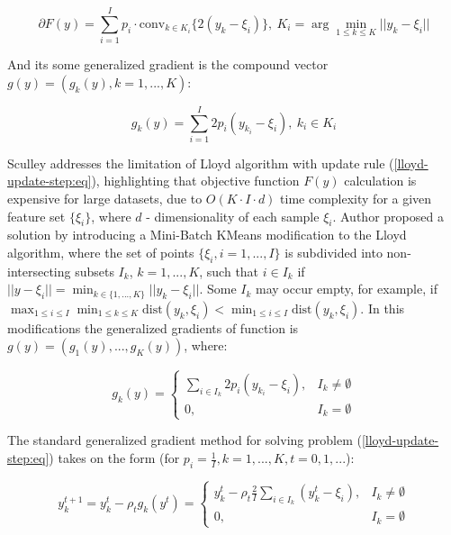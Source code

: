 \begin{equation}
    \label{lloyd-grad-set:eq}
        \partial F(y) = \sum_{i=1}^I p_i \cdot \text{conv}_{k \in K_i} \{ 2 (y_k - \xi_i) \}, \> K_i = \arg \min_{1 \leq k \leq K} || y_k - \xi_i ||
\end{equation}

And its some generalized gradient is the compound vector $ g(y) = (g_k(y), k = 1, ..., K) $:

\begin{equation}
    \label{lloyd-compound-grad:eq}
        g_k(y) = \sum_{i=1}^I 2 p_i (y_{k_i} - \xi_i), \> k_i \in K_i
\end{equation}

Sculley \cite{Sculley_2010} addresses the limitation of Lloyd algorithm with update rule (\ref{lloyd-update-step:eq}), highlighting that objective function $ F(y) $ calculation is expensive for large datasets, due to $ O(K \cdot I \cdot d) $ time complexity for a given feature set $ \{ \xi_i \} $, where $ d $ - dimensionality of each sample $ \xi_i $. Author proposed a solution by introducing a Mini-Batch KMeans modification to the Lloyd algorithm, where the set of points $ \{ \xi_i, i = 1, ..., I \} $ is subdivided into non-intersecting subsets $ I_k $, $ k = 1, ..., K $,  such that $ i \in I_k $ if $ || y - \xi_i || = \min_{k \in \{ 1, ..., K \}} || y_k - \xi_i || $.  Some $ I_k $ may occur empty, for example, if $ \max_{1 \leq i \leq I} \min_{1 \leq k \leq K} \text{dist} (y_k, \xi_i) < \min_{1 \leq i \leq I} \text{dist} (y_k, \xi_i) $. In this modifications the generalized gradients of function is $ g(y) = (g_1(y), ..., g_K(y)) $, where:

\begin{equation}
    \label{lloyd-gen-grad-component:eq}
    g_k(y) = \begin{cases}
        \sum_{i \in I_k} 2 p_i (y_{k_i} - \xi_i), & I_k \neq \emptyset \\
        0, & I_k = \emptyset 
    \end{cases}
\end{equation}

The standard generalized gradient method for solving problem (\ref{lloyd-update-step:eq}) takes on the form (for $ p_i = \frac{1}{I}, k = 1, ..., K, t = 0, 1, ... $):

\begin{equation}
    \label{lloyd-gen-grad:eq}
    y_k^{t+1} = y_k^t - \rho_t g_k(y^t) = \begin{cases}
        y_k^t - \rho_t \frac{2}{I} \sum_{i \in I_k} (y_k^t - \xi_i), & I_k \neq \emptyset \\
        0, & I_k = \emptyset
    \end{cases}
\end{equation}


